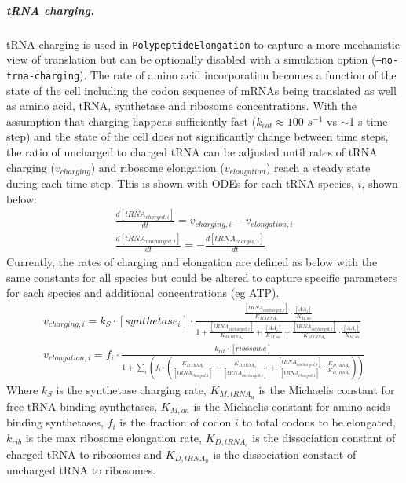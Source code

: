 \documentclass[12pt]{article}
\begin{document}
\subparagraph{tRNA charging.}
tRNA charging is used in \texttt{PolypeptideElongation} to capture a more mechanistic view of translation but can be optionally disabled with a simulation option (\texttt{--no-trna-charging}).  The rate of amino acid incorporation becomes a function of the state of the cell including the codon sequence of mRNAs being translated as well as amino acid, tRNA, synthetase and ribosome concentrations.  With the assumption that charging happens sufficiently fast ($k_{cat} \approx 100$ $s^{-1}$ vs $\sim$1 s time step) and the state of the cell does not significantly change between time steps, the ratio of uncharged to charged tRNA can be adjusted until rates of tRNA charging ($v_{charging}$) and ribosome elongation ($v_{elongation}$) reach a steady state during each time step.  This is shown with ODEs for each tRNA species, $i$, shown below:
\begin{gather}
\frac{d[tRNA_{charged,i}]}{dt} = v_{charging,i} - v_{elongation,i} \\
\frac{d[tRNA_{uncharged,i}]}{dt} = -\frac{d[tRNA_{charged,i}]}{dt}
\end{gather}
Currently, the rates of charging and elongation are defined as below with the same constants for all species but could be altered to capture specific parameters for each species and additional concentrations (eg ATP).
\begin{gather}
v_{charging,i} = k_{S}\cdot[synthetase_i]\cdot\frac{\frac{[tRNA_{uncharged,i}]}{K_{M,tRNA_u}}\cdot\frac{[AA_i]}{\cdot K_{M,aa}}}{1 + \frac{[tRNA_{uncharged,i}]}{K_{M,tRNA_u}} + \frac{[AA_i]}{K_{M,aa}} + \frac{[tRNA_{uncharged,i}]}{K_{M,tRNA_u}}\cdot\frac{[AA_i]}{\cdot K_{M,aa}}} \\
v_{elongation,i} = f_i\cdot\frac{k_{rib}\cdot[ribosome]}{1 + \sum\limits_i(f_i\cdot(\frac{K_{D, tRNA_c}}{[tRNA_{charged,i}]} + \frac{K_{D, tRNA_u}}{[tRNA_{uncharged,i}]} + \frac{[tRNA_{uncharged,i}]}{[tRNA_{charged,i}]}\cdot\frac{K_{D, tRNA_c}}{K_{D, tRNA_u}}))}
\label{eq:v-rib}
\end{gather}
Where $k_S$ is the synthetase charging rate, $K_{M,tRNA_u}$ is the Michaelis constant for free tRNA binding synthetases, $K_{M,aa}$ is the Michaelis constant for amino acids binding synthetases, $f_i$ is the fraction of codon $i$ to total codons to be elongated, $k_{rib}$ is the max ribosome elongation rate, $K_{D, tRNA_c}$ is the dissociation constant of charged tRNA to ribosomes and $K_{D, tRNA_u}$ is the dissociation constant of uncharged tRNA to ribosomes.
\end{document}
